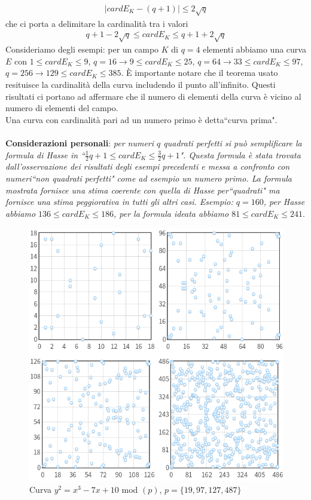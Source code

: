 \documentclass[a4paper,12pt]{tesiinfo}
\newcommand\ddfrac[2]{\frac{\displaystyle #1}{\displaystyle #2}}
\begin{document}
\begin{align*}
    \mid cardE_K - (q+1) \mid \le 2 \sqrt{q}
\end{align*}
che ci porta a delimitare la cardinalit\`a tra i valori 
\begin{align*}
    q+1-2 \sqrt {q} \le cardE_K \le q+1+2 \sqrt {q}
\end{align*}
Consideriamo degli esempi: per un campo $K$ di $q=4$ elementi abbiamo una curva $E$ con $1 \le cardE_K \le 9$, $q=16 \to 9 \le cardE_K \le 25$, $q=64 \to 33 \le cardE_K \le 97$, $q=256 \to 129 \le cardE_K \le 385$. \`E importante notare che il teorema usato resituisce la cardinalit\`a della curva includendo il punto all'infinito.
Questi risultati ci portano ad affermare che il numero di elementi della curva \`e vicino al numero di elementi del campo. 
\\
Una curva con cardinalit\`a pari ad un numero primo \`e detta``curva prima".
\\
\\
\textbf{Considerazioni personali}: \textit{per numeri $q$ quadrati perfetti si pu\`o semplificare la formula di Hasse in ``$ \ddfrac{1}{2}q +1 \le cardE_K \le \ddfrac{3}{2}q +1$". Questa formula \`e stata trovata dall'osservazione dei risultati degli esempi precedenti e messa a confronto con numeri``non quadrati perfetti" come ad esempio un numero primo. La formula mostrata fornisce una stima coerente con quella di Hasse per``quadrati" ma fornisce una stima peggiorativa in tutti gli altri casi. Esempio: $q=160$, per Hasse abbiamo $136 \le cardE_K \le 186$, per la formula ideata abbiamo $81 \le cardE_K \le 241$}. 
\begin{figure}[H]
    \includegraphics[width=.8\textwidth,center]{ECmod(p)}
    \caption{Curva $y^2 = x^3-7x+10$ mod $(p)$, $p = \{19, 97, 127, 487\}$}
\end{figure}
\end{document}

